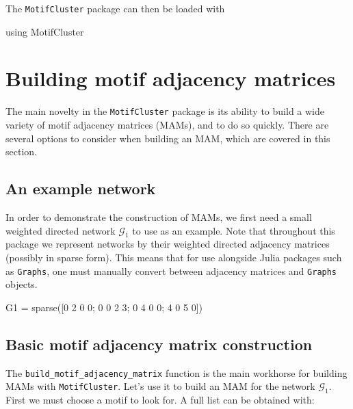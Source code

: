 \documentclass{article}
\begin{document}
The \texttt{MotifCluster} package can then be loaded with

\begin{tcolorbox}[colback=black!5!white,colframe=black!15!white]
\begin{juliablock}
using MotifCluster
\end{juliablock}
\end{tcolorbox}



\section{Building motif adjacency matrices}

The main novelty in the \texttt{MotifCluster} package is its ability to
build a wide variety of motif adjacency matrices (MAMs), and to do so quickly.
There are several options to consider when building an MAM,
which are covered in this section.

\subsection{An example network}

In order to demonstrate the construction of MAMs,
we first need a small weighted directed network
$\mathcal{G}_1$ to use as an example.
Note that throughout this package we represent networks by their
weighted directed adjacency matrices (possibly in sparse form).
This means that for use alongside Julia packages such as \texttt{Graphs},
one must manually convert between adjacency matrices and
\texttt{Graphs} objects.

\begin{tcolorbox}[colback=black!5!white,colframe=black!15!white]
\begin{juliablock}
G1 = sparse([0 2 0 0; 0 0 2 3; 0 4 0 0; 4 0 5 0])
\end{juliablock}
\end{tcolorbox}

\subsection{Basic motif adjacency matrix construction}

The \texttt{build\_motif\_adjacency\_matrix} function is the main workhorse
for building MAMs with \texttt{MotifCluster}.
Let's use it to build an MAM for the network $\mathcal{G}_1$.
First we must choose a motif to look for.
A full list can be obtained with:
\end{document}

